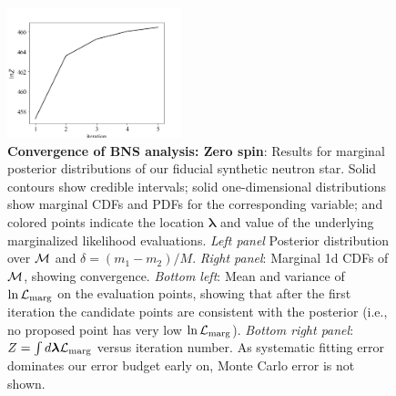 \documentclass[twocolumn,prd,nofootinbib]{revtex4}
\newcommand\editremark[1]{{\color{red} #1}}
\newcommand{\mc}{{\cal M}}
\begin{document}
\begin{figure}
\includegraphics[width=0.45\textwidth]{figures/bns_zerospin_lnL_converge.png}
\caption{\label{fig:BNS:MultiIterate}\textbf{Convergence of BNS analysis: Zero spin}: Results for marginal posterior distributions
  of our fiducial synthetic neutron star.  Solid contours show credible intervals; solid one-dimensional distributions
  show marginal CDFs and PDFs for the corresponding variable; and colored points indicate the location $\bm{\lambda}$ and
  value of the underlying marginalized likelihood evaluations.  
\emph{Left panel } Posterior distribution
  over  $\mc$ and
  $\delta=(m_1-m_2)/M$.    \emph{Right panel}: Marginal 1d CDFs of $\mc$, showing convergence.
\emph{Bottom left}: Mean and variance of  $\ln{\cal L}_{\rm marg}$ on the evaluation points,  showing that after the
first iteration the
candidate points are consistent with the posterior (i.e., no proposed point has very low $\ln {\cal L}_{\rm marg}$).
\emph{Bottom right panel}: $Z = \int d\bm{\lambda} {\cal L}_{\rm marg}$ versus iteration number.  As systematic fitting error dominates our
error budget early on, Monte Carlo error is not shown.
}
\end{figure}

\end{document}
